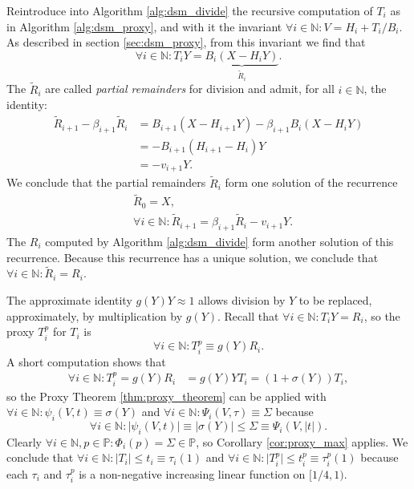 \documentclass[10pt]{article}
\theoremstyle{definition}
\theoremstyle{remark}
\numberwithin{equation}{section}
\newcommand{\nats}{\mathbb{N}}
\newcommand{\pee}{\mathbb{P}}
\newcommand{\abs}[1]{\lvert #1 \rvert}
\begin{document}
Reintroduce into Algorithm \ref{alg:dsm_divide} the recursive computation of $T_i$ as in Algorithm \ref{alg:dsm_proxy}, and with it the invariant $\forall i \in \nats: V = H_i + T_i/B_i$. As described in section \ref{sec:dsm_proxy}, from this invariant we find that
\[
\forall i \in \nats: T_i Y = \underbrace{B_i (X - H_i Y)}_{\tilde{R}_i}.
\]
The $\tilde{R}_i$ are called \emph{partial remainders} for division and admit, for all $i \in \nats$, the identity:
\begin{align*} 
\tilde{R}_{i+1} - \beta_{i+1} \tilde{R}_i &= B_{i+1}(X - H_{i+1} Y) - \beta_{i+1} B_i (X - H_i Y) \\
&= - B_{i+1}(H_{i+1} - H_i) Y \\
&= - v_{i+1} Y .
\end{align*}
We conclude that the partial remainders $\tilde{R}_i$ form one solution of the recurrence 
\begin{align*}
&\tilde{R}_0 = X, \\ 
&\forall i \in \nats: 
\tilde{R}_{i+1} = \beta_{i+1} \tilde{R}_i - v_{i+1} Y.
\end{align*}
The $R_i$ computed by Algorithm \ref{alg:dsm_divide} form another solution of this recurrence. Because this recurrence has a unique solution, we conclude that $\forall i \in \nats: \tilde{R}_i = R_i$.

The approximate identity $g(Y)Y \approx 1$ allows division by $Y$ to be replaced, approximately, by multiplication by $g(Y)$. Recall that $\forall i \in \nats: T_i Y = R_i$, so the proxy $T_i^p$ for $T_i$ is
\[
\forall i \in \nats: T^p_i \equiv g(Y) R_i .
\]
A short computation shows that
\begin{align*}
\forall i \in \nats: T^p_i = g(Y) R_i &= g(Y) Y T_i = (1+\sigma(Y)) T_i,
\end{align*}
so the Proxy Theorem \ref{thm:proxy_theorem} can be applied with $\forall i \in \nats: \psi_i(V,t) \equiv \sigma(Y)$ and $\forall i \in \nats:\Psi_i(V,\tau) \equiv \Sigma$ because 
\[
\forall i \in \nats: \abs{\psi_i(V,t)} \equiv \abs{\sigma(Y)} \le \Sigma \equiv \Psi_i(V,\abs{t}) .
\]
Clearly $\forall i \in \nats, p \in \pee: \Phi_i(p) = \Sigma \in \pee$, so Corollary \ref{cor:proxy_max} applies. 
We conclude that $\forall i \in \nats:\abs{T_i} \le t_i \equiv \tau_i(1)$ and $\forall i \in \nats:\abs{T^p_i} \le t_i^p \equiv \tau_i^p(1)$ because
each $\tau_i$ and $\tau_i^p$ is a non-negative increasing linear function on $[1/4,1)$.
\end{document}
